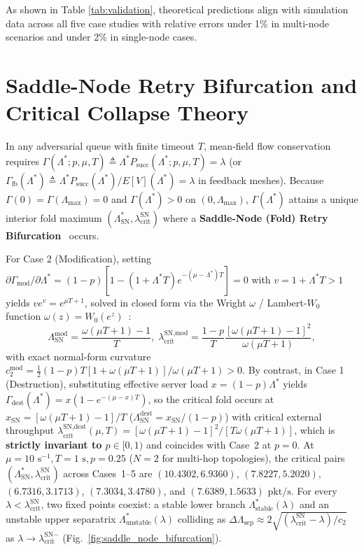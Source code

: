 \documentclass[journal,compsoc]{IEEEtran}
\begin{document}
As shown in Table \ref{tab:validation}, theoretical predictions align with simulation data across all five case studies with relative errors under 1\% in multi-node scenarios and under 2\% in single-node cases.

\section{Saddle-Node Retry Bifurcation and Critical Collapse Theory}
In any adversarial queue with finite timeout $T$, mean-field flow conservation requires $\Gamma(\Lambda^*; p, \mu, T) \triangleq \Lambda^* P_{\text{succ}}(\Lambda^*; p, \mu, T) = \lambda$ (or $\Gamma_{\text{fb}}(\Lambda^*) \triangleq \Lambda^* P_{\text{succ}}(\Lambda^*)/E[V](\Lambda^*) = \lambda$ in feedback meshes). Because $\Gamma(0) = \Gamma(\Lambda_{\max}) = 0$ and $\Gamma(\Lambda^*) > 0$ on $(0, \Lambda_{\max})$, $\Gamma(\Lambda^*)$ attains a unique interior fold maximum $(\Lambda_{\text{SN}}^*, \lambda_{\text{crit}}^{\text{SN}})$ where a \textbf{Saddle-Node (Fold) Retry Bifurcation}~\cite{strogatz2015nonlinear} occurs.

For Case 2 (Modification), setting $\partial \Gamma_{\text{mod}}/\partial \Lambda^* = (1 - p)[1 - (1 + \Lambda^* T)e^{-(\mu - \Lambda^*)T}] = 0$ with $v = 1 + \Lambda^* T > 1$ yields $v e^v = e^{\mu T + 1}$, solved in closed form via the Wright $\omega$ / Lambert-$W_0$ function $\omega(z) = W_0(e^z)$~\cite{corless1996lambertw}:
\begin{equation}
\Lambda_{\text{SN}}^{\text{mod}} = \frac{\omega(\mu T + 1) - 1}{T}, \;
\lambda_{\text{crit}}^{\text{SN,mod}} = \frac{1 - p}{T}\frac{[\omega(\mu T + 1) - 1]^2}{\omega(\mu T + 1)},
\end{equation}
with exact normal-form curvature $c_2^{\text{mod}} = \frac{1}{2}(1-p)T[1 + \omega(\mu T + 1)]/\omega(\mu T + 1) > 0$. By contrast, in Case 1 (Destruction), substituting effective server load $x = (1-p)\Lambda^*$ yields $\Gamma_{\text{dest}}(\Lambda^*) = x(1 - e^{-(\mu-x)T})$, so the critical fold occurs at $x_{\text{SN}} = [\omega(\mu T + 1) - 1]/T$ ($\Lambda_{\text{SN}}^{\text{dest}} = x_{\text{SN}}/(1-p)$) with critical external throughput $\lambda_{\text{crit}}^{\text{SN,dest}}(\mu, T) = [\omega(\mu T + 1) - 1]^2 / [T\omega(\mu T + 1)]$, which is \textbf{strictly invariant to $p \in [0, 1)$} and coincides with Case~2 at $p=0$. At $\mu = 10\text{ s}^{-1}, T = 1\text{ s}, p = 0.25$ ($N=2$ for multi-hop topologies), the critical pairs $(\Lambda_{\text{SN}}^*, \lambda_{\text{crit}}^{\text{SN}})$ across Cases~1--5 are $(10.4302, 6.9360)$, $(7.8227, 5.2020)$, $(6.7316, 3.1713)$, $(7.3034, 3.4780)$, and $(7.6389, 1.5633)\text{ pkt/s}$. For every $\lambda < \lambda_{\text{crit}}^{\text{SN}}$, two fixed points coexist: a stable lower branch $\Lambda_{\text{stable}}^*(\lambda)$ and an unstable upper separatrix $\Lambda_{\text{unstable}}^*(\lambda)$ colliding as $\Delta\Lambda_{\text{sep}} \approx 2\sqrt{(\lambda_{\text{crit}}^{\text{SN}} - \lambda)/c_2}$ as $\lambda \to \lambda_{\text{crit}}^{\text{SN}-}$ (Fig.~\ref{fig:saddle_node_bifurcation}).
\end{document}

